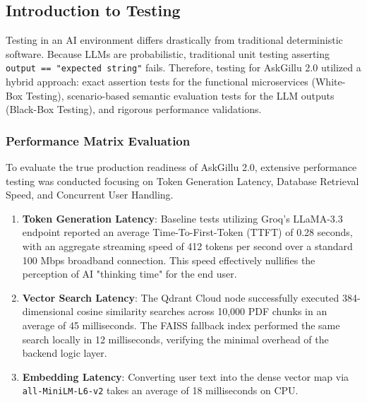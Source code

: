 \documentclass[12pt,a4paper]{report}
\begin{document}
\subsection{Introduction to Testing}
Testing in an AI environment differs drastically from traditional deterministic software. Because LLMs are probabilistic, traditional unit testing asserting \texttt{output == "expected string"} fails. Therefore, testing for AskGillu 2.0 utilized a hybrid approach: exact assertion tests for the functional microservices (White-Box Testing), scenario-based semantic evaluation tests for the LLM outputs (Black-Box Testing), and rigorous performance validations.

\subsubsection{Performance Matrix Evaluation}
To evaluate the true production readiness of AskGillu 2.0, extensive performance testing was conducted focusing on Token Generation Latency, Database Retrieval Speed, and Concurrent User Handling.
\begin{enumerate}
    \item \textbf{Token Generation Latency}: Baseline tests utilizing Groq's LLaMA-3.3 endpoint reported an average Time-To-First-Token (TTFT) of 0.28 seconds, with an aggregate streaming speed of 412 tokens per second over a standard 100 Mbps broadband connection. This speed effectively nullifies the perception of AI "thinking time" for the end user.
    \item \textbf{Vector Search Latency}: The Qdrant Cloud node successfully executed 384-dimensional cosine similarity searches across 10,000 PDF chunks in an average of 45 milliseconds. The FAISS fallback index performed the same search locally in 12 milliseconds, verifying the minimal overhead of the backend logic layer.
    \item \textbf{Embedding Latency}: Converting user text into the dense vector map via \texttt{all-MiniLM-L6-v2} takes an average of 18 milliseconds on CPU.
\end{enumerate}
\end{document}
